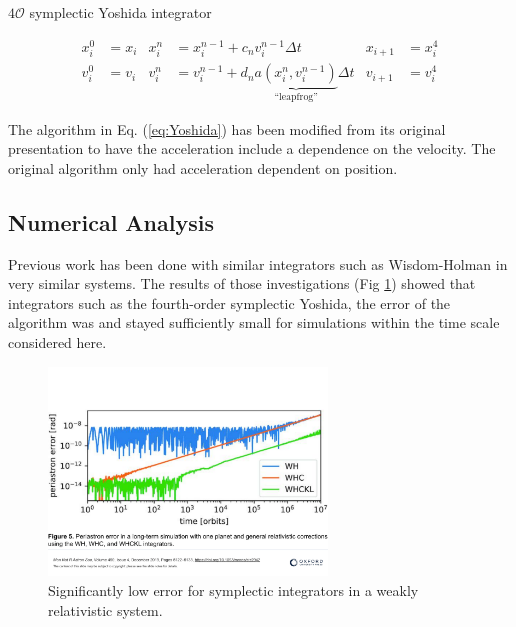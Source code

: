 \documentclass{report}
\begin{document}
            \begin{center} 
                $4 \mathcal{O}$ symplectic Yoshida integrator\cite{YOSHIDA1990262} 
            \end{center}
            \begin{align} \label{eq:Yoshida}
                x_i^0 &= x_i & x_i^n &= x_i^{n - 1} + c_n v_i^{n - 1} \Delta t & x_{i + 1} &= x_i^4 \\
                v_i^0 &= v_i & v_i^n &= v_i^{n - 1} + d_n \underbrace{a \left( x_i^n, v_i^{n - 1} \right)}_\text{``leapfrog''} \Delta t & v_{i + 1} &= v_i^4
            \end{align}

            The algorithm in Eq. (\ref{eq:Yoshida}) has been modified from its original presentation to have the acceleration include a dependence on the velocity.  The original algorithm only had acceleration dependent on position.

\pagebreak

        \subsection{Numerical Analysis}

            Previous work\cite{SymplecticNBody} has been done with similar integrators such as Wisdom-Holman in very similar systems.  The results of those investigations (Fig \ref{fig:Accuracy}) showed that integrators such as the fourth-order symplectic Yoshida, the error of the algorithm was and stayed sufficiently small for simulations within the time scale considered here.

            \begin{figure}[h]
                \centering
                \includegraphics[width=0.66\textwidth]{images/Accuracy_plot.pdf}
                \caption{Significantly low error for symplectic integrators in a weakly relativistic system.}
                \label{fig:Accuracy}
            \end{figure}
\end{document}
